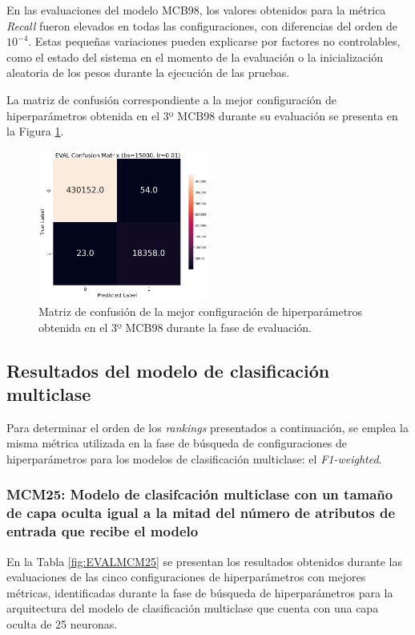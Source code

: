 En las evaluaciones del modelo MCB98, los valores obtenidos para la métrica \textit{Recall} fueron elevados en todas las configuraciones, con diferencias del orden de $10^{-4}$. Estas pequeñas variaciones pueden explicarse por factores no controlables, como el estado del sistema en el momento de la evaluación o la inicialización aleatoria de los pesos durante la ejecución de las pruebas.


La matriz de confusión correspondiente a la mejor configuración de hiperparámetros obtenida en el 3º MCB98 durante su evaluación se presenta en la Figura \ref{fig:MC_EVAL_MCB98}.

\begin{figure}[H]
    \centering
    \includegraphics[width=0.5\textwidth]{./img/evaluacion/matrices_confusion/MC_EVAL_MCB98.png}
    \caption{Matriz de confusión de la mejor configuración de hiperparámetros obtenida en el 3º MCB98 durante la fase de evaluación.}
    \label{fig:MC_EVAL_MCB98}
\end{figure}




\subsection{Resultados del modelo de clasificación multiclase}
Para determinar el orden de los \textit{rankings} presentados a continuación, se emplea la misma métrica utilizada en la fase de búsqueda de configuraciones de hiperparámetros para los modelos de clasificación multiclase: el \textit{F1-weighted}.

\subsubsection{MCM25: Modelo de clasifcación multiclase con un tamaño de capa oculta igual a la mitad del número de atributos de entrada que recibe el modelo}

En la Tabla \ref{fig:EVALMCM25} se presentan los resultados obtenidos durante las evaluaciones de las cinco configuraciones de hiperparámetros con mejores métricas, identificadas durante la fase de búsqueda de hiperparámetros para la arquitectura del modelo de clasificación multiclase que cuenta con una capa oculta de 25 neuronas.

